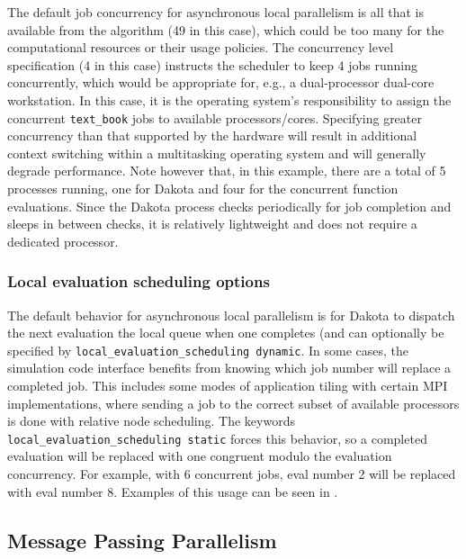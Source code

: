 The default job concurrency for asynchronous local parallelism is all
that is available from the algorithm (49 in this case), which could be
too many for the computational resources or their usage policies.  The
concurrency level specification (4 in this case) instructs the
scheduler to keep 4 jobs running concurrently, which would be
appropriate for, e.g., a dual-processor dual-core workstation.  In
this case, it is the operating system's responsibility to assign the
concurrent \texttt{text\_book} jobs to available processors/cores.
Specifying greater concurrency than that supported by the hardware
will result in additional context switching within a multitasking
operating system and will generally degrade performance.  Note however
that, in this example, there are a total of 5 processes running, one
for Dakota and four for the concurrent function evaluations.  Since
the Dakota process checks periodically for job completion and sleeps
in between checks, it is relatively lightweight and does not require a
dedicated processor.

\subsubsection{Local evaluation scheduling options}\label{parallel:SLP:local:sched}

The default behavior for asynchronous local parallelism is for Dakota
to dispatch the next evaluation the local queue when one completes
(and can optionally be specified by
\texttt{local\_evaluation\_scheduling dynamic}.  In some cases, the
simulation code interface benefits from knowing which job number will
replace a completed job.  This includes some modes of application
tiling with certain MPI implementations, where sending a job to the
correct subset of available processors is done with relative node
scheduling.  The keywords
\texttt{local\_evaluation\_scheduling static} forces this behavior,
so a completed evaluation will be replaced with one congruent modulo
the evaluation concurrency.  For example, with 6 concurrent jobs, eval
number 2 will be replaced with eval number 8.  Examples of this usage
can be seen in .


\subsection{Message Passing Parallelism}\label{parallel:SLP:message}

